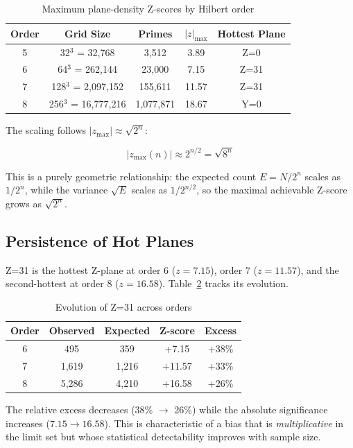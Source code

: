 \documentclass[11pt,a4paper]{article}
\begin{document}
\begin{table}[h]
\centering
\caption{Maximum plane-density Z-scores by Hilbert order}
\label{tab:scaling}
\begin{tabular}{ccccc}
\toprule
Order & Grid Size & Primes & $|z|_{\max}$ & Hottest Plane \\
\midrule
5 & 32$^3$ = 32,768       & 3,512      & 3.89  & Z=0 \\
6 & 64$^3$ = 262,144      & 23,000     & 7.15  & Z=31 \\
7 & 128$^3$ = 2,097,152   & 155,611    & 11.57 & Z=31 \\
8 & 256$^3$ = 16,777,216  & 1,077,871  & 18.67 & Y=0 \\
\bottomrule
\end{tabular}
\end{table}

The scaling follows $|z_{\max}| \approx \sqrt{2^n}$:

\begin{equation}
|z_{\max}(n)| \approx 2^{n/2} = \sqrt{8^n}
\label{eq:scaling}
\end{equation}

This is a purely geometric relationship: the expected count $E = N/2^n$
scales as $1/2^n$, while the variance $\sqrt{E}$ scales as $1/2^{n/2}$,
so the maximal achievable Z-score grows as $\sqrt{2^n}$.

\subsection{Persistence of Hot Planes}

Z=31 is the hottest Z-plane at order 6 ($z=7.15$), order 7 ($z=11.57$),
and the second-hottest at order 8 ($z=16.58$). Table~\ref{tab:z31}
tracks its evolution.

\begin{table}[h]
\centering
\caption{Evolution of Z=31 across orders}
\label{tab:z31}
\begin{tabular}{ccccc}
\toprule
Order & Observed & Expected & Z-score & Excess \\
\midrule
6 & 495   & 359  & +7.15  & +38\% \\
7 & 1,619 & 1,216 & +11.57 & +33\% \\
8 & 5,286 & 4,210 & +16.58 & +26\% \\
\bottomrule
\end{tabular}
\end{table}

The relative excess decreases (38\% $\to$ 26\%) while the absolute
significance increases ($7.15 \to 16.58$). This is characteristic of a
bias that is \emph{multiplicative} in the limit set but whose statistical
detectability improves with sample size.
\end{document}
